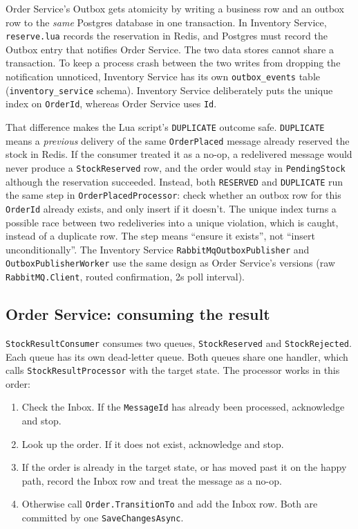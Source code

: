 \documentclass[a4paper]{report}
\begin{document}
Order Service's Outbox gets atomicity by writing a business row and an outbox
row to the \emph{same} Postgres database in one transaction. In Inventory
Service, \texttt{reserve.lua} records the reservation in Redis, and Postgres
must record the Outbox entry that notifies Order Service. The two data stores cannot
share a transaction. To keep a process crash between the two writes from
dropping the notification unnoticed, Inventory Service has its own
\texttt{outbox\_events} table (\texttt{inventory\_service} schema). Inventory
Service deliberately puts the unique index on \texttt{OrderId}, whereas Order
Service uses \texttt{Id}.

That difference makes the Lua script's \texttt{DUPLICATE} outcome safe.
\texttt{DUPLICATE} means a \emph{previous} delivery of the same
\texttt{OrderPlaced} message already reserved the stock in Redis. If the
consumer treated it as a no-op, a redelivered message would never produce a
\texttt{StockReserved} row, and the order would stay in \texttt{PendingStock}
although the reservation succeeded. Instead, both \texttt{RESERVED} and \texttt{DUPLICATE} run the
same step in \texttt{OrderPlacedProcessor}: check whether an outbox row
for this \texttt{OrderId} already exists, and only insert if it doesn't. The
unique index turns a possible race between two redeliveries into a unique
violation, which is caught, instead of a duplicate row. The step means
``ensure it exists'', not ``insert unconditionally''. The Inventory Service \texttt{RabbitMqOutboxPublisher}
and \texttt{OutboxPublisherWorker} use the same design as Order Service's
versions (raw \texttt{RabbitMQ.Client}, routed confirmation, 2s poll
interval).

\subsection{Order Service: consuming the result}

\texttt{StockResultConsumer} consumes two queues, \texttt{StockReserved} and
\texttt{StockRejected}. Each queue has its own dead-letter queue. Both queues
share one handler, which calls \texttt{StockResultProcessor} with the target
state. The processor works in this order:

\begin{enumerate}
  \item Check the Inbox. If the \texttt{MessageId} has already been
    processed, acknowledge and stop.
  \item Look up the order. If it does not exist, acknowledge and stop.
  \item If the order is already in the target state, or has moved past it on
    the happy path, record the Inbox row and treat the message as a no-op.
  \item Otherwise call \texttt{Order.TransitionTo} and add the Inbox row.
    Both are committed by one \texttt{SaveChangesAsync}.
\end{enumerate}
\end{document}
